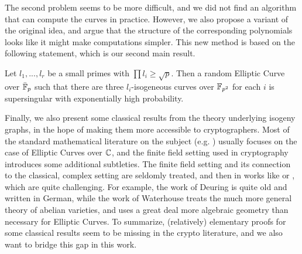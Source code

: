 The second problem seems to be more difficult, and we did not find an algorithm that can compute the curves in practice.
However, we also propose a variant of the original idea, and argue that the structure of the corresponding polynomials looks like it might make computations simpler.
This new method is based on the following statement, which is our second main result.
\begin{prop}
    \label{prop:main_result2}
    Let $l_1, ..., l_r$ be a small primes with $\prod l_i \geq \sqrt{p}$.
    Then a random Elliptic Curve over $\bar{\mathbb{F}}_p$ such that there are three $l_i$-isogeneous curves over $\mathbb{F}_{p^2}$ for each $i$ is supersingular with exponentially high probability.
\end{prop}
Finally, we also present some classical results from the theory underlying isogeny graphs, in the hope of making them more accessible to cryptographers.
Most of the standard mathematical literature on the subject (e.g. \cite{cox_primes_of_form}) usually focuses on the case of Elliptic Curves over $\mathbb{C}$, and the finite field setting used in cryptography introduces some additional subtleties.
The finite field setting and its connection to the classical, complex setting are seldomly treated, and then in works like \cite{deuring_endomorphism_rings} or \cite{class_group_action_waterhouse}, which are quite challenging.
For example, the work of Deuring \cite{deuring_endomorphism_rings} is quite old and written in German, while the work of Waterhouse \cite{class_group_action_waterhouse} treats the much more general theory of abelian varieties, and uses a great deal more algebraic geometry than necessary for Elliptic Curves. 
To summarize, (relatively) elementary proofs for some classical results seem to be missing in the crypto literature, and we also want to bridge this gap in this work.
